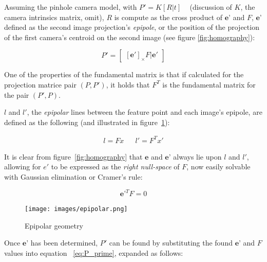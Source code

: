 \documentclass[12pt]{article}
\begin{document}
Assuming the pinhole camera model, with $P'=K[R|t]$ ~\cite{moulon:hal-00829332} (discussion of $K$, the camera intrinsics matrix, omit), $R$ is compute as the cross product of $\textbf{e'}$ and $F$, $\textbf{e'}$ defined as the second image projection's \textit{epipole}, or the position of the projection of the first camera's centroid on the second image (see figure \ref{fig:homography}):

\begin{equation}\label{eq:P_prime}
    P'=
    \begin{bmatrix}
        [\mathbf{e'}]_\times F|\mathbf{e'}
    \end{bmatrix}
\end{equation}

One of the properties of the fundamental matrix is that if calculated for the projection matrice pair $(P, P')$, it holds that $F^{T}$ is the fundamental matrix for the pair $(P', P)$.

$l$ and $l'$, the \textit{epipolar} lines between the feature point and each image's epipole, are defined as the following (and illustrated in figure~\ref{fig:epipolar}):

\begin{align}\label{eq:epipolarLines}
    l = Fx
&&
    l' = F^Tx'
\end{align}

It is clear from figure~\ref{fig:homography} that $\textbf{e}$ and $\textbf{e'}$ always lie upon $l$ and $l'$, allowing for $e'$ to be expressed as the \textit{right null-space} of $F$, now easily solvable with Gaussian elimination or Cramer's rule: 

\begin{equation}\label{eq:F_left_nullspace}
    \textbf{e'}^TF=0
\end{equation}

\begin{figure}\begin{center}
    \texttt{[image: images/epipolar.png]}
        \caption{Epipolar geometry ~\cite{Hartley2004}}
        \label{fig:epipolar}
\end{center}\end{figure}

Once $\textbf{e'}$ has been determined, $P'$ can be found by substituting the found $\textbf{e'}$ and $F$ values into equation ~\eqref{eq:P_prime}, expanded as follows:
\end{document}
